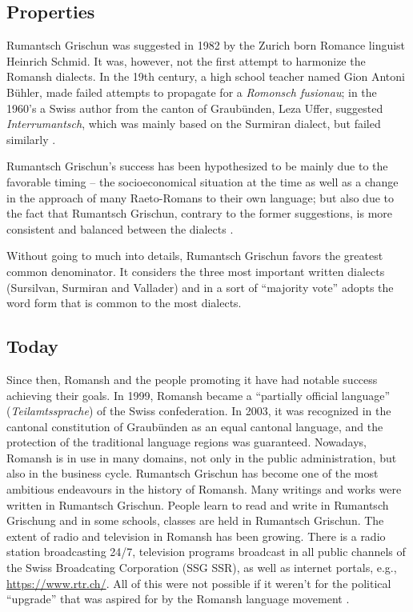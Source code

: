 \subsection{Properties}
Rumantsch Grischun was suggested in 1982 by the Zurich born Romance linguist Heinrich Schmid. 
It was, however, not the first attempt to harmonize the Romansh dialects. 
In the 19th century, a high school teacher named Gion Antoni Bühler, made failed attempts to propagate for a \emph{Romonsch fusionau}; in the 1960's a Swiss author from the canton of Graubünden, Leza Uffer, suggested \emph{Interrumantsch}, which was mainly based on the Surmiran dialect, but failed similarly \cite[39]{liver1999}.

Rumantsch Grischun's success has been hypothesized to be mainly due to the favorable timing -- the socioeconomical situation at the time as well as a change in the approach of many Raeto-Romans to their own language; but also due to the fact that Rumantsch Grischun, contrary to the former suggestions, is more consistent and balanced between the dialects \autocite[69]{liver1999}.

Without going to much into details, Rumantsch Grischun favors the greatest common denominator. 
It considers the three most important written dialects (Sursilvan, Surmiran and Vallader) and in a sort of \enquote{majority vote} adopts the word form that is common to the most dialects.

\subsection{Today}
Since then, Romansh and the people promoting it have had notable success achieving their goals. 
In 1999, Romansh became a \enquote{partially official language} (\emph{Teilamtssprache}) of the Swiss confederation. 
In 2003, it was recognized in the cantonal constitution of Graubünden as an equal cantonal language, and the protection of the traditional language regions was guaranteed.
Nowadays, Romansh is in use in many domains, not only in the public administration, but also in the business cycle. 
Rumantsch Grischun has become one of the most ambitious endeavours in the history of Romansh. 
Many writings and works were written in Rumantsch Grischun. 
People learn to read and write in Rumantsch Grischung and in some schools, classes are held in Rumantsch Grischun. 
The extent of radio and television in Romansh has been growing. 
There is a radio station broadcasting 24/7, television programs broadcast in all public channels of the Swiss Broadcating Corporation (SSG SSR), as well as  internet portals, e.g., \url{https://www.rtr.ch/}. All of this were not possible if it weren't for the political \enquote{upgrade} that was aspired for by the Romansh language movement \autocite{cathomas2012}.






